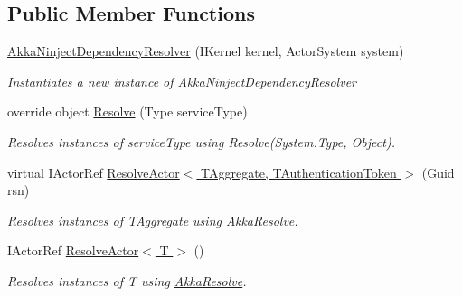 \subsection*{Public Member Functions}
\begin{DoxyCompactItemize}
\item 
\hyperlink{classCqrs_1_1Ninject_1_1Akka_1_1AkkaNinjectDependencyResolver_a7fdff6e54ac903d86bb79bf5536f8820_a7fdff6e54ac903d86bb79bf5536f8820}{Akka\+Ninject\+Dependency\+Resolver} (I\+Kernel kernel, Actor\+System system)
\begin{DoxyCompactList}\small\item\em Instantiates a new instance of \hyperlink{classCqrs_1_1Ninject_1_1Akka_1_1AkkaNinjectDependencyResolver}{Akka\+Ninject\+Dependency\+Resolver} \end{DoxyCompactList}\item 
override object \hyperlink{classCqrs_1_1Ninject_1_1Akka_1_1AkkaNinjectDependencyResolver_adace29de71f10e34e952bd41e48106a6_adace29de71f10e34e952bd41e48106a6}{Resolve} (Type service\+Type)
\begin{DoxyCompactList}\small\item\em Resolves instances of {\itshape service\+Type}  using Resolve(\+System.\+Type, Object). \end{DoxyCompactList}\item 
virtual I\+Actor\+Ref \hyperlink{classCqrs_1_1Ninject_1_1Akka_1_1AkkaNinjectDependencyResolver_ab5ba20875aab8764bbb7d6df61722436_ab5ba20875aab8764bbb7d6df61722436}{Resolve\+Actor$<$ T\+Aggregate, T\+Authentication\+Token $>$} (Guid rsn)
\begin{DoxyCompactList}\small\item\em Resolves instances of {\itshape T\+Aggregate}  using \hyperlink{classCqrs_1_1Ninject_1_1Akka_1_1AkkaNinjectDependencyResolver_a8e55618bf89a2c14bc3d0e7b3253f17d_a8e55618bf89a2c14bc3d0e7b3253f17d}{Akka\+Resolve}. \end{DoxyCompactList}\item 
I\+Actor\+Ref \hyperlink{classCqrs_1_1Ninject_1_1Akka_1_1AkkaNinjectDependencyResolver_a6c3399c949a77457456d77688eb66054_a6c3399c949a77457456d77688eb66054}{Resolve\+Actor$<$ T $>$} ()
\begin{DoxyCompactList}\small\item\em Resolves instances of {\itshape T}  using \hyperlink{classCqrs_1_1Ninject_1_1Akka_1_1AkkaNinjectDependencyResolver_a8e55618bf89a2c14bc3d0e7b3253f17d_a8e55618bf89a2c14bc3d0e7b3253f17d}{Akka\+Resolve}. \end{DoxyCompactList}\item 

\end{DoxyCompactItemize}
